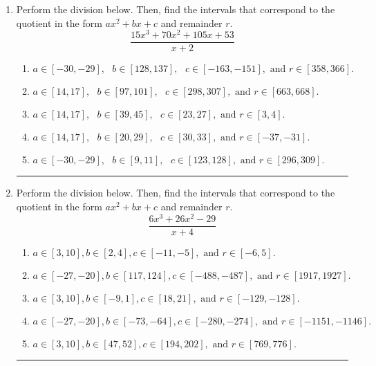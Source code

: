 \documentclass[14pt]{extbook}
\newcommand{\litem}[1]{\item#1\hspace*{-1cm}\rule{\textwidth}{0.4pt}}
\begin{document}
\begin{enumerate}
{\begin{enumerate}[label=\Alph*.]
\end{enumerate} }
\litem{
Perform the division below. Then, find the intervals that correspond to the quotient in the form $ax^2+bx+c$ and remainder $r$.\[ \frac{15x^{3} +70 x^{2} +105 x + 53}{x + 2} \]\begin{enumerate}[label=\Alph*.]
\item \( a \in [-30, -29], \text{   } b \in [128, 137], \text{   } c \in [-163, -151], \text{   and   } r \in [358, 366]. \)
\item \( a \in [14, 17], \text{   } b \in [97, 101], \text{   } c \in [298, 307], \text{   and   } r \in [663, 668]. \)
\item \( a \in [14, 17], \text{   } b \in [39, 45], \text{   } c \in [23, 27], \text{   and   } r \in [3, 4]. \)
\item \( a \in [14, 17], \text{   } b \in [20, 29], \text{   } c \in [30, 33], \text{   and   } r \in [-37, -31]. \)
\item \( a \in [-30, -29], \text{   } b \in [9, 11], \text{   } c \in [123, 128], \text{   and   } r \in [296, 309]. \)

\end{enumerate} }
\litem{
Perform the division below. Then, find the intervals that correspond to the quotient in the form $ax^2+bx+c$ and remainder $r$.\[ \frac{6x^{3} +26 x^{2} -29}{x + 4} \]\begin{enumerate}[label=\Alph*.]
\item \( a \in [3, 10], b \in [2, 4], c \in [-11, -5], \text{ and } r \in [-6, 5]. \)
\item \( a \in [-27, -20], b \in [117, 124], c \in [-488, -487], \text{ and } r \in [1917, 1927]. \)
\item \( a \in [3, 10], b \in [-9, 1], c \in [18, 21], \text{ and } r \in [-129, -128]. \)
\item \( a \in [-27, -20], b \in [-73, -64], c \in [-280, -274], \text{ and } r \in [-1151, -1146]. \)
\item \( a \in [3, 10], b \in [47, 52], c \in [194, 202], \text{ and } r \in [769, 776]. \)

\end{enumerate} }
\end{enumerate}
\end{document}
